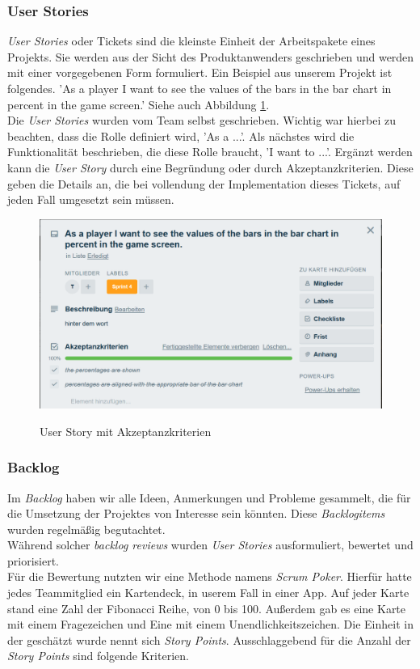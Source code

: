 \documentclass[11pt]{article}
\begin{document}
\subsubsection{User Stories}
\label{chap:userstories}
\textit{User Stories} oder Tickets sind die kleinste Einheit der Arbeitspakete eines Projekts. Sie werden aus der Sicht des Produktanwenders geschrieben und werden mit einer vorgegebenen Form formuliert. Ein Beispiel aus unserem Projekt ist folgendes. 'As a player I want to see the values of the bars in the bar chart in percent in the game screen.' Siehe auch Abbildung \ref{fig:userstory}.\\
Die \textit{User Stories} wurden vom Team selbst geschrieben. Wichtig war hierbei zu beachten, dass die Rolle definiert wird, 'As a ...'. Als nächstes wird die Funktionalität beschrieben, die diese Rolle braucht, 'I want to ...'. Ergänzt werden kann die \textit{User Story} durch eine Begründung oder durch Akzeptanzkriterien. Diese geben die Details an, die bei vollendung der Implementation dieses Tickets, auf jeden Fall umgesetzt sein müssen.

\begin{figure}[ht]
\centering
 {\includegraphics[width=1\textwidth]{images/userstory.png}}
\caption{\label{fig:userstory}User Story mit Akzeptanzkriterien}
\end{figure}

\subsubsection{Backlog}
Im \textit{Backlog} haben wir alle Ideen, Anmerkungen und Probleme gesammelt, die für die Umsetzung der Projektes von Interesse sein könnten. Diese \textit{Backlogitems} wurden regelmäßig begutachtet.\\
Während solcher \textit{backlog reviews} wurden \textit{User Stories} ausformuliert, bewertet und priorisiert.\\
Für die Bewertung nutzten wir eine Methode namens \textit{Scrum Poker}. Hierfür hatte jedes Teammitglied ein Kartendeck, in userem Fall in einer App. Auf jeder Karte stand eine Zahl der Fibonacci Reihe, von 0 bis 100. Außerdem gab es eine Karte mit einem Fragezeichen und Eine mit einem Unendlichkeitszeichen. Die Einheit in der geschätzt wurde nennt sich \textit{Story Points}. Ausschlaggebend für die Anzahl der \textit{Story Points} sind folgende Kriterien.
\end{document}
